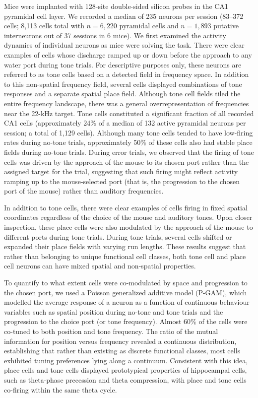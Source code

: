 Mice were implanted with 128-site double-sided silicon probes in the CA1 pyramidal cell layer. We recorded a median of 235 neurons per session (83--372 cells; 8,113 cells total with $n = 6,220$ pyramidal cells and $n = 1,893$ putative interneurons out of 37 sessions in 6 mice). We first examined the activity dynamics of individual neurons as mice were solving the task. There were clear examples of cells whose discharge ramped up or down before the approach to any water port during tone trials. For descriptive purposes only, these neurons are referred to as tone cells based on a detected field in frequency space. In addition to this non-spatial frequency field, several cells displayed combinations of tone responses and a separate spatial place field. Although tone cell fields tiled the entire frequency landscape, there was a general overrepresentation of frequencies near the 22-kHz target. Tone cells constituted a significant fraction of all recorded CA1 cells (approximately 24\% of a median of 132 active pyramidal neurons per session; a total of 1,129 cells). Although many tone cells tended to have low-firing rates during no-tone trials, approximately 50\% of these cells also had stable place fields during no-tone trials. During error trials, we observed that the firing of tone cells was driven by the approach of the mouse to its chosen port rather than the assigned target for the trial, suggesting that such firing might reflect activity ramping up to the mouse-selected port (that is, the progression to the chosen port of the mouse) rather than auditory frequencies.

In addition to tone cells, there were clear examples of cells firing in fixed spatial coordinates regardless of the choice of the mouse and auditory tones. Upon closer inspection, these place cells were also modulated by the approach of the mouse to different ports during tone trials. During tone trials, several cells shifted or expanded their place fields with varying run lengths. These results suggest that rather than belonging to unique functional cell classes, both tone cell and place cell neurons can have mixed spatial and non-spatial properties.

To quantify to what extent cells were co-modulated by space and progression to the chosen port, we used a Poisson generalized additive model (P-GAM), which modelled the average response of a neuron as a function of continuous behaviour variables such as spatial position during no-tone and tone trials and the progression to the choice port (or tone frequency). Almost 60\% of the cells were co-tuned to both position and tone frequency. The ratio of the mutual information for position versus frequency revealed a continuous distribution, establishing that rather than existing as discrete functional classes, most cells exhibited tuning preferences lying along a continuum. Consistent with this idea, place cells and tone cells displayed prototypical properties of hippocampal cells, such as theta-phase precession and theta compression, with place and tone cells co-firing within the same theta cycle.

